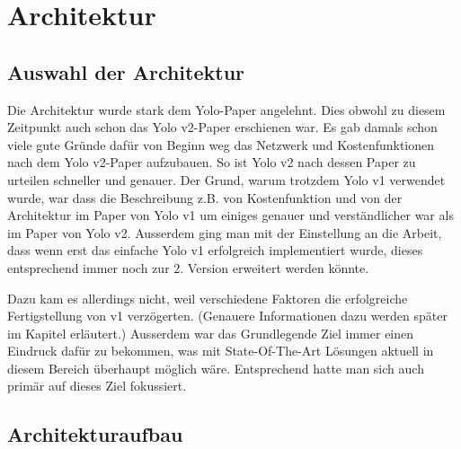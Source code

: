 \newpage
\section{Architektur} 

\subsection{Auswahl der Architektur}
Die Architektur wurde stark dem Yolo-Paper \cite{yolo} angelehnt. 
Dies obwohl zu diesem Zeitpunkt auch schon das Yolo v2-Paper \cite{yolo2} erschienen war.
Es gab damals schon viele gute Gründe dafür von Beginn weg das Netzwerk und Kostenfunktionen nach dem Yolo v2-Paper aufzubauen.
So ist Yolo v2 nach dessen Paper zu urteilen schneller und genauer. 
Der Grund, warum trotzdem Yolo v1 verwendet wurde, war dass die Beschreibung z.B. von Kostenfunktion und von der Architektur im Paper von Yolo v1 um einiges genauer und verständlicher war als im Paper von Yolo v2.
Ausserdem ging man mit der Einstellung an die Arbeit, dass wenn erst das \grqq{}einfache\grqq{} Yolo v1  erfolgreich implementiert wurde, dieses entsprechend immer noch zur 2. Version erweitert werden könnte.


Dazu kam es allerdings nicht, weil verschiedene Faktoren die erfolgreiche Fertigstellung von v1 verzögerten. 
(Genauere Informationen dazu werden später im Kapitel  erläutert.) 
Ausserdem war das Grundlegende Ziel immer einen Eindruck dafür zu bekommen, was mit State-Of-The-Art Lösungen aktuell in diesem Bereich überhaupt möglich wäre.
Entsprechend hatte man sich auch primär auf dieses Ziel fokussiert.

\subsection{Architekturaufbau}
\label{chapter:Architekturaubau}

